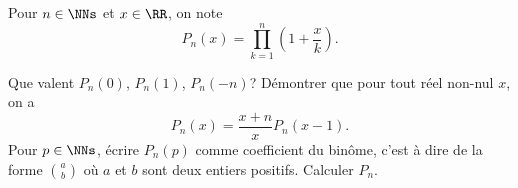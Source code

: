 %
%
Pour $n\in \NNs$ et $x\in \RR$, on note $$P_n(x)=\prod_{k=1}^n \left(1+\frac xk\right).$$
	\begin{tasks}
		\task Que valent $P_n(0)$, $P_n(1)$, $P_n(-n)$?
		\task Démontrer que pour tout réel non-nul $x$, on a
		$$P_n(x)=\frac {x+n}xP_n(x-1).$$
		\task Pour $p\in \NNs$, écrire $P_n(p)$ comme coefficient du binôme, c'est à dire de la forme $\binom a b$ où $a$ et $b$ sont deux entiers positifs.
		\task Calculer $P_n$.
	\end{tasks}
